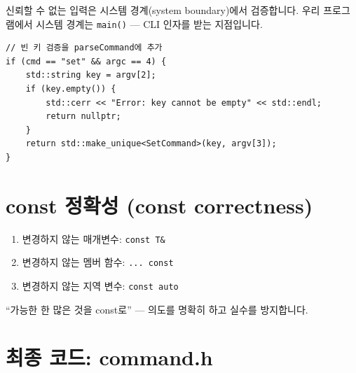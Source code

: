 \documentclass[11pt,a4paper]{book}
\newcommand{\code}[1]{\texttt{#1}}
\begin{document}
신뢰할 수 없는 입력은 시스템 경계(system boundary)에서 검증합니다. 우리 프로그램에서 시스템 경계는 \code{main()} — CLI 인자를 받는 지점입니다.

\begin{lstlisting}[style=cpp]
// 빈 키 검증을 parseCommand에 추가
if (cmd == "set" && argc == 4) {
    std::string key = argv[2];
    if (key.empty()) {
        std::cerr << "Error: key cannot be empty" << std::endl;
        return nullptr;
    }
    return std::make_unique<SetCommand>(key, argv[3]);
}
\end{lstlisting}

\section{const 정확성 (const correctness)}

\begin{conceptbox}[title={const correctness 규칙}]
\begin{enumerate}[nosep]
\item 변경하지 않는 매개변수: \code{const T\&}
\item 변경하지 않는 멤버 함수: \code{... const}
\item 변경하지 않는 지역 변수: \code{const auto}
\end{enumerate}
``가능한 한 많은 것을 const로'' — 의도를 명확히 하고 실수를 방지합니다.
\end{conceptbox}

\section{최종 코드: command.h}
\end{document}
